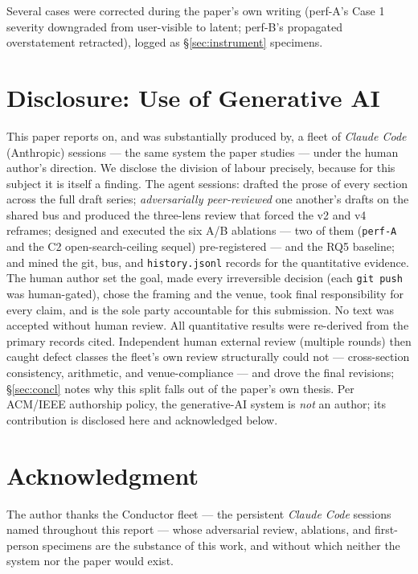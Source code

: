 \documentclass[10pt,conference]{IEEEtran}   %
\begin{document}
Several cases were corrected during the paper's own writing (perf-A's Case 1 severity
downgraded from user-visible to latent; perf-B's propagated overstatement retracted),
logged as \S\ref{sec:instrument} specimens.

\section*{Disclosure: Use of Generative AI}
This paper reports on, and was substantially produced by, a fleet of \emph{Claude Code}
(Anthropic) sessions --- the same system the paper studies --- under the human author's direction.
We disclose the division of labour precisely, because for this subject it is itself a finding. The
agent sessions: drafted the prose of every section across the full draft series; \emph{adversarially
peer-reviewed} one another's drafts on the shared bus and produced the three-lens review that forced
the v2 and v4 reframes; designed and executed the six A/B ablations --- two of them (\texttt{perf-A}
and the C2 open-search-ceiling sequel) pre-registered --- and the RQ5
baseline; and mined the git, bus, and \texttt{history.jsonl}
records for the quantitative evidence. The human author set the goal, made every
irreversible decision (each \texttt{git push} was human-gated), chose the framing and the venue,
took final responsibility for every claim, and is the sole party accountable for this submission. No
text was accepted without human review. All quantitative results were re-derived from the primary
records cited. Independent human external review (multiple rounds) then caught defect classes the
fleet's own review structurally could not --- cross-section consistency, arithmetic, and
venue-compliance --- and drove the final revisions; \S\ref{sec:concl} notes why this split falls out of the
paper's own thesis. Per ACM/IEEE authorship policy, the generative-AI system is \emph{not} an author;
its contribution is disclosed here and acknowledged below.

\section*{Acknowledgment}
The author thanks the Conductor fleet --- the persistent \emph{Claude Code} sessions named
throughout this report --- whose adversarial review, ablations, and
first-person specimens are the substance of this work, and without which neither the system nor
the paper would exist.



\end{document}
